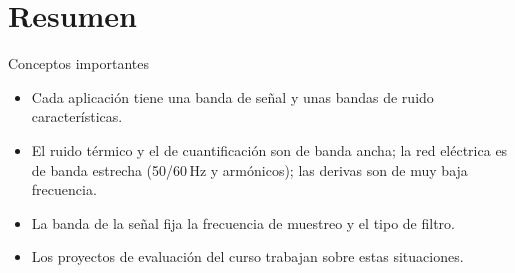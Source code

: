 \documentclass[aspectratio=169,11pt]{beamer}
\begin{document}
\section*{Resumen}
\begin{frame}{Conceptos importantes}
  \begin{itemize}
    \item Cada aplicación tiene una banda de señal y unas bandas de ruido características.
    \item El ruido térmico y el de cuantificación son de banda ancha; la red eléctrica es de banda estrecha (50/60\,Hz y armónicos); las derivas son de muy baja frecuencia.
    \item La banda de la señal fija la frecuencia de muestreo y el tipo de filtro.
    \item Los proyectos de evaluación del curso trabajan sobre estas situaciones.
  \end{itemize}
\end{frame}
\end{document}
